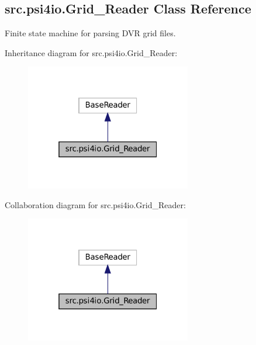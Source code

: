 \hypertarget{classsrc_1_1psi4io_1_1Grid__Reader}{}\subsection{src.\+psi4io.\+Grid\+\_\+\+Reader Class Reference}
\label{classsrc_1_1psi4io_1_1Grid__Reader}


Finite state machine for parsing D\+VR grid files.  




Inheritance diagram for src.\+psi4io.\+Grid\+\_\+\+Reader\+:
\nopagebreak
\begin{figure}[H]
\begin{center}
\leavevmode
\includegraphics[width=205pt]{classsrc_1_1psi4io_1_1Grid__Reader__inherit__graph}
\end{center}
\end{figure}


Collaboration diagram for src.\+psi4io.\+Grid\+\_\+\+Reader\+:
\nopagebreak
\begin{figure}[H]
\begin{center}
\leavevmode
\includegraphics[width=205pt]{classsrc_1_1psi4io_1_1Grid__Reader__coll__graph}
\end{center}
\end{figure}
